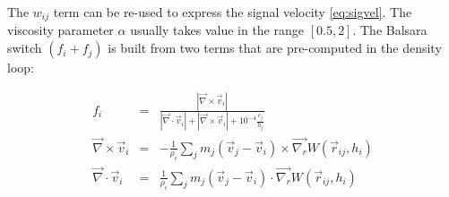 \documentclass[a4paper,10pt]{report}
\begin{document}
The $w_{ij}$ term can be re-used to express the signal velocity \ref{eq:sigvel}. The viscosity parameter $\alpha$
usually takes value in the range $[0.5, 2]$. The Balsara switch $(f_i+f_j)$ is built from two terms that are
pre-computed in the density loop:

\begin{eqnarray*}
 f_i &=& \frac{|\vec\nabla \times \vec{v}_i|}{|\vec\nabla \cdot \vec{v}_i| + |\vec\nabla \times \vec{v}_i| +
10^{-4}\frac{c_j}{h_j}} \\
 \vec\nabla \times \vec{v}_i &=& -\frac{1}{\rho_i}\sum_j m_j (\vec{v}_j - \vec{v}_i)\times
\vec{\nabla_r}W(\vec{r}_{ij}, h_i) \\
 \vec\nabla \cdot \vec{v}_i &=& \frac{1}{\rho_i}\sum_j m_j (\vec{v}_j - \vec{v}_i)\cdot \vec{\nabla_r}W(\vec{r}_{ij},
h_i)
\end{eqnarray*}
\end{document}
